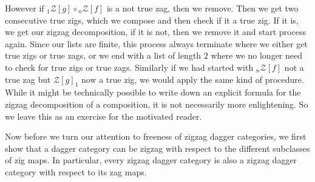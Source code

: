 \documentclass[10pt]{article}
\begin{document}
However if ${}_1\mathcal{Z}[g] \circ {}_n\mathcal{Z}[f]$ is a not true zag, then we remove. Then we get two consecutive true zigs, which we compose and then check if it a true zig. If it is, we get our zigzag decomposition, if it is not, then we remove it and start process again. Since our lists are finite, this process always terminate where we either get true zigs or true zags, or we end with a list of length $2$ where we no longer need to check for true zigs or true zags. Similarly if we had started with ${}_n\mathcal{Z}[f]$ not a true zag but $\mathcal{Z}[g]_1$ now a true zig, we would apply the same kind of procedure. While it might be technically possible to write down an explicit formula for the zigzag decomposition of a composition, it is not necessarily more enlightening. So we leave this as an exercise for the motivated reader. 

Now before we turn our attention to freeness of zigzag dagger categories, we first show that a dagger category can be zigzag with respect to the different subclasses of zig maps. In particular, every zigzag dagger category is also a zigzag dagger category with respect to its zag maps. 
\end{document}
